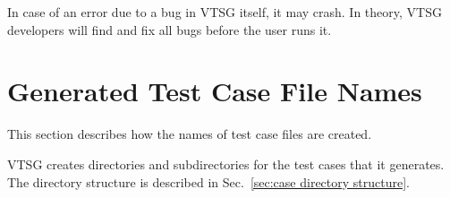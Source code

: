 In case of an error due to a bug in VTSG itself, it may crash.  In theory, VTSG
developers will find and fix all bugs before the user runs it.


\section{Generated Test Case File Names}

This section describes how the names of test case files are created.

VTSG creates directories and subdirectories for the test cases that it generates.
The directory structure is described in
Sec.~\ref{sec:case directory structure}.

\label{sec:case file name}

